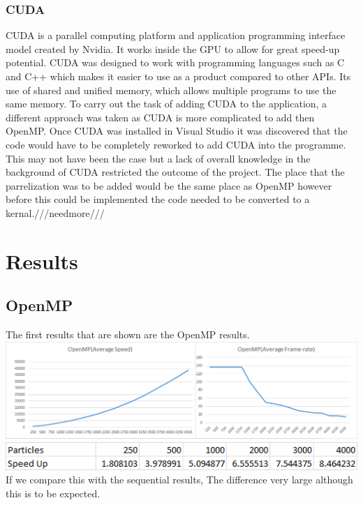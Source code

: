 \documentclass[12pt]{article}
\begin{document}
\subsubsection{CUDA}
CUDA is a  parallel computing platform and application programming interface model created by Nvidia. It works inside the GPU to allow for great speed-up potential. CUDA was designed to work with programming languages such as C and C++ which makes it easier to use as a product compared to other APIs. Its use of shared and unified memory, which allows multiple programs to use the same memory.
\newline
 To carry out the task of adding CUDA to the application, a different approach was taken as CUDA is more complicated to add then OpenMP. Once CUDA was installed in Visual Studio it was discovered that the code would have to be completely reworked to add CUDA into the programme. This may not have been the case but a lack of overall knowledge in the background of CUDA restricted the outcome of the project.
 \newline 
 The place that the parrelization was to be added would be the same place as OpenMP however before this could be implemented the code needed to be converted to a kernal.///needmore///

\section{Results}
\subsection{OpenMP}
The first results that are shown are the OpenMP results.
\newline
\includegraphics[scale=0.5]{pics/optest.png}
\newline
\includegraphics[scale=0.7]{pics/opspeedup.png}
\newline
If we compare this with the sequential results, The difference very large although this is to be expected. 
\end{document}
